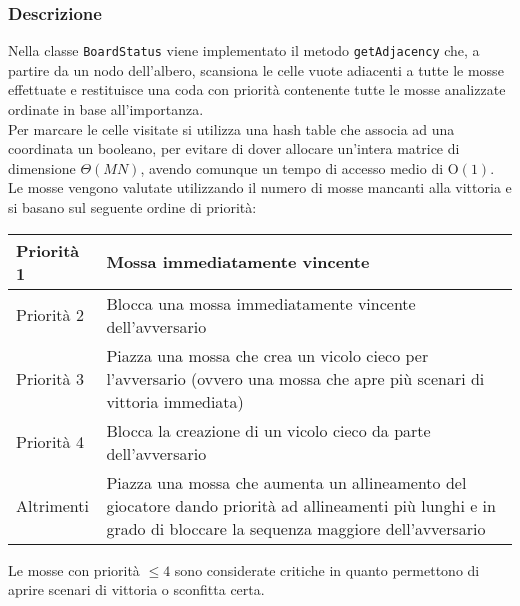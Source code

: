 \documentclass[11pt]{article}
\begin{document}
\subsubsection*{Descrizione}
Nella classe \texttt{BoardStatus} viene implementato il metodo \texttt{getAdjacency} che, a partire da un nodo dell'albero, scansiona le celle vuote adiacenti a tutte le mosse effettuate e restituisce una coda con priorità contenente tutte le mosse analizzate ordinate in base all'importanza.\\
Per marcare le celle visitate si utilizza una hash table che associa ad una coordinata un booleano, per evitare di dover allocare un'intera matrice di dimensione $\Theta(MN)$, avendo comunque un tempo di accesso medio di O$(1)$.\\
Le mosse vengono valutate utilizzando il numero di mosse mancanti alla vittoria e si basano sul seguente ordine di priorità:
\begin{table}[H]	%
\centering			%
\def\arraystretch{1.5}
\begin{tabular}{|l|p{4in}|}	%
\hline	%
Priorità 1 & Mossa immediatamente vincente \\ \hline
Priorità 2 & Blocca una mossa immediatamente vincente dell'avversario \\ \hline
Priorità 3 & Piazza una mossa che crea un vicolo cieco per l'avversario (ovvero una mossa che apre più scenari di vittoria immediata) \\ \hline
Priorità 4 & Blocca la creazione di un vicolo cieco da parte dell'avversario \\ \hline
Altrimenti & Piazza una mossa che aumenta un allineamento del giocatore dando priorità ad allineamenti più lunghi e in grado di bloccare la sequenza maggiore dell'avversario \\ \hline
\end{tabular}
\end{table}
$ $\\
Le mosse con priorità $\leq 4$ sono considerate critiche in quanto permettono di aprire scenari di vittoria o sconfitta certa.
\end{document}
